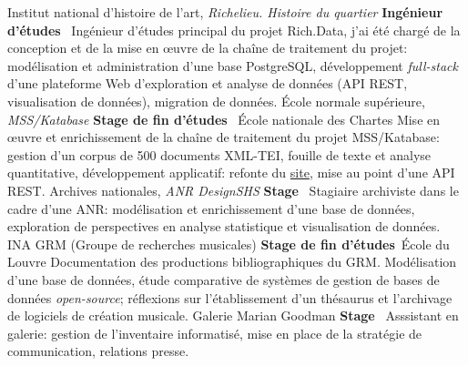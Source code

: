 	{%
		Institut national d'histoire de l'art, \textit{Richelieu. Histoire du quartier}}
	{%
		\textbf{Ingénieur d'études}~}
	{%
		Ingénieur d'études principal du projet Rich.Data, j'ai été chargé de la conception et de la mise en \oe{}uvre de la chaîne de traitement du projet: modélisation et administration d'une base PostgreSQL, développement \textit{full-stack} d'une plateforme Web d'exploration et analyse de données (API REST, visualisation de données), migration de données.}
	{%
		École normale supérieure, \textit{MSS/Katabase}}
	{%
		\textbf{Stage de fin d'études}~ École nationale des Chartes}
	{%
		Mise en \oe{}uvre et enrichissement de la chaîne de traitement du projet MSS/Katabase: gestion d'un corpus de 500 documents XML-TEI, fouille de texte et analyse quantitative, développement applicatif: refonte du \href{https://katabase.huma-num.fr/}{site}, mise au point d'une API REST.}
	{%
		Archives nationales, \textit{ANR DesignSHS}}
	{%
		\textbf{Stage}~}
	{%
		Stagiaire archiviste dans le cadre d’une ANR: modélisation et enrichissement d'une base
		de données, exploration de perspectives en analyse statistique et visualisation de données.}
	{%
		INA GRM (Groupe de recherches musicales)}
	{%
		\textbf{Stage de fin d'études}~École du Louvre}
	{%
		Documentation des productions bibliographiques du GRM. Modélisation d'une base de données, étude comparative de systèmes de gestion de bases de données \textit{open-source}; réflexions sur l'établissement d’un thésaurus et l'archivage de logiciels de création musicale.}
	{%
		Galerie Marian Goodman}
	{%
		\textbf{Stage}~}
	{%
		Asssistant en galerie: gestion de l'inventaire informatisé, mise en place de la stratégie de communication, relations presse.}
